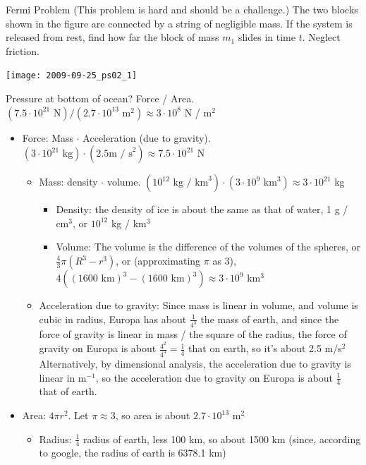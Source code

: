 \documentclass{esg8012pset}
\begin{document}
\begin{question}[Problem 2]
\begin{problem}{Fermi Problem (This problem is hard and should be a challenge.)}
  The two blocks shown in the figure are connected by a string of negligible mass. If the system is released from rest, find how far the block of mass $m_1$ slides in time $t$. Neglect friction.
\begin{center}\texttt{[image: 2009-09-25\_ps02\_1]}\end{center}
\end{problem}%
\begin{solution}
  Pressure at bottom of ocean?  Force / Area.  $(7.5\cdot 10^{21}\text{ N}) / (2.7 \cdot 10^{13}\text{ m}^2) \approx 3 \cdot 10^8$ N / m$^2$
  \begin{itemize}
    \item Force: Mass $\cdot$ Acceleration (due to gravity). $(3 \cdot 10^{21}\text{ kg}) \cdot (2.5\text{m / s}^2) \approx 7.5\cdot 10^{21}$ N
      \begin{itemize}
        \item Mass: density $\cdot$ volume.  $(10^{12}\text{ kg / km}^3) \cdot (3 \cdot 10^9\text{ km}^3) \approx 3 \cdot 10^{21}$ kg
          \begin{itemize}
            \item Density: the density of ice is about the same as that of water, 1 g / cm$^3$, or $10^{12}$ kg / km$^3$
            \item Volume: The volume is the difference of the volumes of the spheres, or $\frac{4}{3}\pi (R^3 - r^3)$, or (approximating $\pi$ as 3), $4((1600\text{ km})^3 - (1600\text{ km})^3) \approx 3 \cdot 10^9$ km$^3$
          \end{itemize}
        \item Acceleration due to gravity: Since mass is linear in volume, and volume is cubic in radius, Europa has about $\frac{1}{4^3}$ the mass of earth, and since the force of gravity is linear in mass / the square of the radius, the force of gravity on Europa is about $\frac{4^2}{4^3} = \frac{1}{4}$ that on earth, so it's about 2.5 m/s$^2$  Alternatively, by dimensional analysis, the acceleration due to gravity is linear in m$^{-1}$, so the acceleration due to gravity on Europa is about $\frac{1}{4}$ that of earth.
      \end{itemize}
    \item Area: $4\pi r^2$.  Let $\pi \approx 3$, so area is about $2.7 \cdot 10^{13}$ m$^2$
      \begin{itemize}
        \item Radius: $\frac{1}{4}$ radius of earth, less 100 km, so about 1500 km (since, according to google, the radius of earth is 6378.1 km)
      \end{itemize}
  \end{itemize}


\end{solution}
\end{question}
\end{document}
